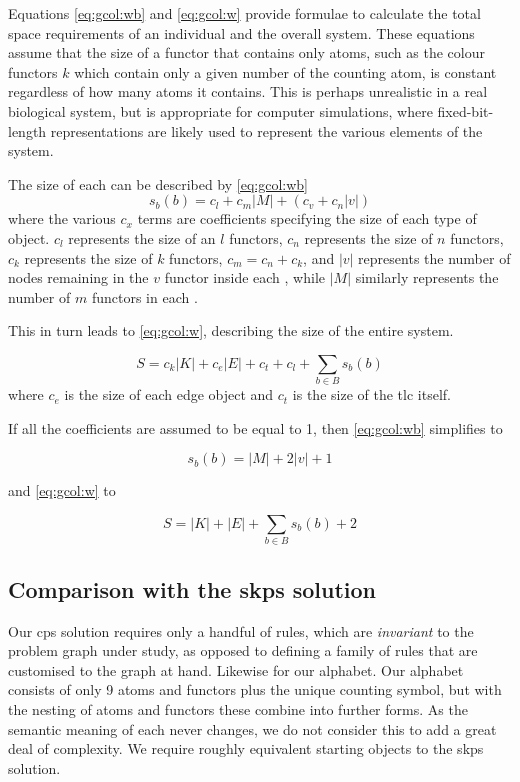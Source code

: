 Equations \eqref{eq:gcol:wb} and \eqref{eq:gcol:w} provide formulae to calculate the total space requirements of an individual \bo{} and the overall system. These equations assume that the size of a functor that contains only atoms, such as the colour functors \(k\) which contain only a given number of the counting atom, is constant regardless of how many atoms it contains.  This is perhaps unrealistic in a real biological system, but is appropriate for computer simulations, where fixed-bit-length representations are likely used to represent the various elements of the system.

The size of each \bo{} can be described by \eqref{eq:gcol:wb}
\begin{equation}\label{eq:gcol:wb}
    s_b(b) = c_l + c_m |M| + (c_v + c_n |v|)
\end{equation} where the various \(c_x\) terms are coefficients specifying the size of each type of object.  \(c_l\) represents the size of an \(l\) functors, \(c_n\) represents the size of \(n\) functors, \(c_k\) represents the size of \(k\) functors, \(c_m = c_n + c_k\), and \(|v|\) represents the number of nodes remaining in the \(v\) functor inside each \bo{}, while \(|M|\) similarly represents the number of \(m\) functors in each \bo{}.

This in turn leads to \eqref{eq:gcol:w}, describing the size of the entire system.

\begin{equation}\label{eq:gcol:w}
    S = c_k |K| + c_e |E| + c_t + c_l + \sum_{b \in B}s_b(b)
\end{equation} where \(c_e\) is the size of each edge object and \(c_t\) is the size of the \gls{tlc} itself.

If all the coefficients are assumed to be equal to 1, then \eqref{eq:gcol:wb} simplifies to 

\begin{equation}
    s_b(b) = |M| + 2 |v| + 1
\end{equation}

and \eqref{eq:gcol:w} to

\begin{equation}
    S = |K| + |E| + \sum_{b \in B}s_b(b) + 2
\end{equation}

\subsection{Comparison with the \texorpdfstring{\acrlong{skps}}{Simple Kernel P systems} solution}
Our \gls{cps} solution requires only a handful of rules, which are \emph{invariant} to the problem graph under study, as opposed to defining a family of rules that are customised to the graph at hand.  Likewise for our alphabet.  Our alphabet consists of only 9 atoms and functors plus the unique counting symbol, but with the nesting of atoms and functors these combine into further forms.  As the semantic meaning of each never changes, we do not consider this to add a great deal of complexity.  We require roughly equivalent starting objects to the \gls{skps} solution.

